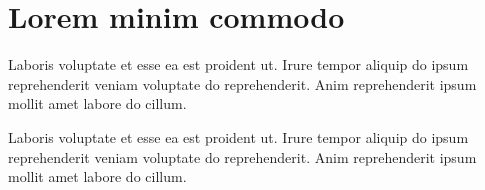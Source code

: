 \documentclass[12pt]{report}
\begin{document}
\section{Lorem minim commodo}

\begin{center}
    Laboris voluptate et esse ea est proident ut. Irure tempor aliquip do ipsum reprehenderit veniam voluptate do reprehenderit. Anim reprehenderit ipsum mollit amet labore do cillum.
\end{center}

\begin{flushright}
    Laboris voluptate et esse ea est proident ut. Irure tempor aliquip do ipsum reprehenderit veniam voluptate do reprehenderit. Anim reprehenderit ipsum mollit amet labore do cillum.
\end{flushright}
\end{document}
